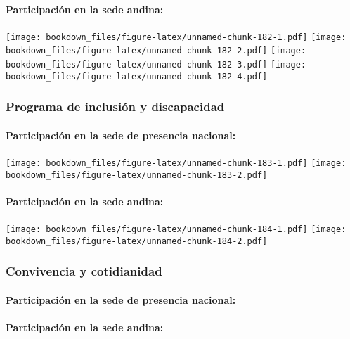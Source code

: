 \documentclass[]{article}
\let\oldparagraph\paragraph
\renewcommand{\paragraph}[1]{\oldparagraph{#1}\mbox{}}
\theoremstyle{definition}
\theoremstyle{definition}
\theoremstyle{definition}
\theoremstyle{remark}
\begin{document}
\paragraph{Participación en la sede
andina:}\label{participacion-en-la-sede-andina-3}

\texttt{[image: bookdown\_files/figure-latex/unnamed-chunk-182-1.pdf]}
\texttt{[image: bookdown\_files/figure-latex/unnamed-chunk-182-2.pdf]}
\texttt{[image: bookdown\_files/figure-latex/unnamed-chunk-182-3.pdf]}
\texttt{[image: bookdown\_files/figure-latex/unnamed-chunk-182-4.pdf]}

\subsubsection{Programa de inclusión y
discapacidad}\label{programa-de-inclusion-y-discapacidad-1}

\paragraph{Participación en la sede de presencia
nacional:}\label{participacion-en-la-sede-de-presencia-nacional-4}

\texttt{[image: bookdown\_files/figure-latex/unnamed-chunk-183-1.pdf]}
\texttt{[image: bookdown\_files/figure-latex/unnamed-chunk-183-2.pdf]}

\paragraph{Participación en la sede
andina:}\label{participacion-en-la-sede-andina-4}

\texttt{[image: bookdown\_files/figure-latex/unnamed-chunk-184-1.pdf]}
\texttt{[image: bookdown\_files/figure-latex/unnamed-chunk-184-2.pdf]}

\subsubsection{Convivencia y
cotidianidad}\label{convivencia-y-cotidianidad-1}

\paragraph{Participación en la sede de presencia
nacional:}\label{participacion-en-la-sede-de-presencia-nacional-5}

\paragraph{Participación en la sede
andina:}\label{participacion-en-la-sede-andina-5}
\end{document}
